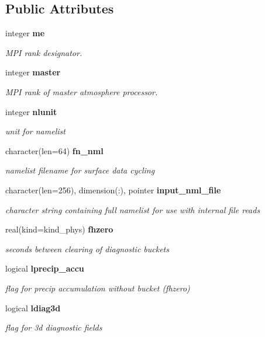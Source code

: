 \subsection*{Public Attributes}
\begin{DoxyCompactItemize}
\item 
integer \textbf{ me}
\begin{DoxyCompactList}\small\item\em M\+PI rank designator. \end{DoxyCompactList}\item 
integer \textbf{ master}
\begin{DoxyCompactList}\small\item\em M\+PI rank of master atmosphere processor. \end{DoxyCompactList}\item 
integer \textbf{ nlunit}
\begin{DoxyCompactList}\small\item\em unit for namelist \end{DoxyCompactList}\item 
character(len=64) \textbf{ fn\+\_\+nml}
\begin{DoxyCompactList}\small\item\em namelist filename for surface data cycling \end{DoxyCompactList}\item 
character(len=256), dimension(\+:), pointer \textbf{ input\+\_\+nml\+\_\+file}
\begin{DoxyCompactList}\small\item\em character string containing full namelist for use with internal file reads \end{DoxyCompactList}\item 
real(kind=kind\+\_\+phys) \textbf{ fhzero}
\begin{DoxyCompactList}\small\item\em seconds between clearing of diagnostic buckets \end{DoxyCompactList}\item 
logical \textbf{ lprecip\+\_\+accu}
\begin{DoxyCompactList}\small\item\em flag for precip accumulation without bucket (fhzero) \end{DoxyCompactList}\item 
logical \textbf{ ldiag3d}
\begin{DoxyCompactList}\small\item\em flag for 3d diagnostic fields \end{DoxyCompactList}\item 

\end{DoxyCompactItemize}
